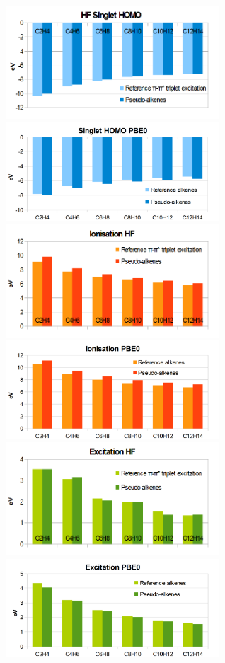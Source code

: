 \documentclass[journal=jctcce,manuscript=article]{achemso}
\begin{document}
\begin{figure}[h]
\includegraphics[width=8cm]{hf_homo}
\includegraphics[width=8cm]{pbe0_homo}
\includegraphics[width=8cm]{hf_ionisation}
\includegraphics[width=8cm]{pbe0_ionisation}
\includegraphics[width=8cm]{hf_excitation}
\includegraphics[width=8cm]{pbe0_excitation}

\end{figure}
\end{document}

